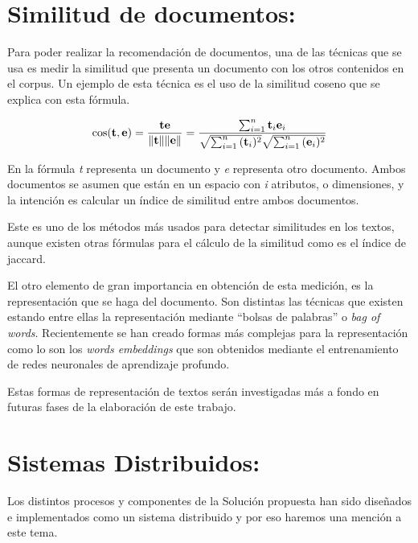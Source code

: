 \documentclass[
  10,
  spanish,
  openany]{book}
\begin{document}
\hypertarget{similitud}{%
\section{Similitud de documentos:}\label{similitud}}

Para poder realizar la recomendación de documentos, una de las técnicas que se usa es medir la similitud que presenta un documento con los otros contenidos en el corpus. Un ejemplo de esta técnica es el uso de la similitud coseno que se explica con esta fórmula.

\begin{equation}
\cos ({\bf t},{\bf e})= {{\bf t} {\bf e} \over \|{\bf t}\| \|{\bf e}\|} = \frac{ \sum_{i=1}^{n}{{\bf t}_i{\bf e}_i} }{ \sqrt{\sum_{i=1}^{n}{({\bf t}_i)^2}} \sqrt{\sum_{i=1}^{n}{({\bf e}_i)^2}} }
\end{equation}

En la fórmula \emph{t} representa un documento y \emph{e} representa otro documento. Ambos documentos se asumen que están en un espacio con \emph{i} atributos, o dimensiones, y la intención es calcular un índice de similitud entre ambos documentos.

Este es uno de los métodos más usados para detectar similitudes en los textos, aunque existen otras fórmulas para el cálculo de la similitud como es el índice de jaccard.

El otro elemento de gran importancia en obtención de esta medición, es la representación que se haga del documento. Son distintas las técnicas que existen estando entre ellas la representación mediante ``bolsas de palabras'' o \emph{bag of words}. Recientemente se han creado formas más complejas para la representación como lo son los \emph{words embeddings} que son obtenidos mediante el entrenamiento de redes neuronales de aprendizaje profundo.

Estas formas de representación de textos serán investigadas más a fondo en futuras fases de la elaboración de este trabajo.

\hypertarget{sistemas-distribuidos}{%
\section{Sistemas Distribuidos:}\label{sistemas-distribuidos}}

Los distintos procesos y componentes de la Solución propuesta han sido diseñados e implementados como un sistema distribuido y por eso haremos una mención a este tema.
\end{document}
